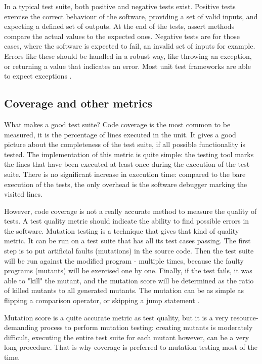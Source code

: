 In a typical test suite, both positive and negative tests exist. Positive tests exercise the correct behaviour of the software, providing a set of valid inputs, and expecting a defined set of outputs. At the end of the tests, assert methods compare the actual values to the expected ones. Negative tests are for those cases, where the software is expected to fail, an invalid set of inputs for example. Errors like these should be handled in a robust way, like throwing an exception, or returning a value that indicates an error. Most unit test frameworks are able to expect exceptions \cite{Olan:2003:UTT:948785.948830}.

\subsection{Coverage and other metrics}
What makes a good test suite? Code coverage is the most common to be measured, it is the percentage of lines executed in the unit. It gives a good picture about the completeness of the test suite, if all possible functionality is tested. The implementation of this metric is quite simple: the testing tool marks the lines that have been executed at least once during the execution of the test suite. There is no significant increase in execution time: compared to the bare execution of the tests, the only overhead is the software debugger marking the visited lines.

However, code coverage is not a really accurate method to measure the quality of tests. A test quality metric should indicate the ability to find possible errors in the software. Mutation testing is a technique that gives that kind of quality metric. It can be run on a test suite that has all its test cases passing. The first step is to put artificial faults (mutations) in the source code. Then the test suite will be run against the modified program - multiple times, because the faulty programs (mutants) will be exercised one by one. Finally, if the test fails, it was able to "kill" the mutant, and the mutation score will be determined as the ratio of killed mutants to all generated mutants. The mutation can be as simple as flipping a comparison operator, or skipping a jump statement \cite{5487526, aron_mut}. 

Mutation score is a quite accurate metric as test quality, but it is a very resource-demanding process to perform mutation testing: creating mutants is moderately difficult, executing the entire test suite for each mutant however, can be a very long procedure. That is why coverage is preferred to mutation testing most of the time.

